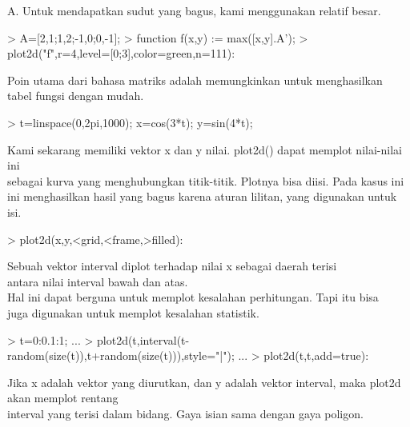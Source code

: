 \documentclass[a4paper,10pt]{article}
\begin{document}
\begin{eulernotebook}
\begin{eulercomment}
\begin{eulercomment}
\begin{eulercomment}
\begin{eulercomment}
\begin{eulercomment}
\begin{eulercomment}
\begin{eulercomment}
A. Untuk mendapatkan sudut yang bagus, kami menggunakan relatif besar.
\end{eulercomment}
\begin{eulerprompt}
> A=[2,1;1,2;-1,0;0,-1];
> function f(x,y) := max([x,y].A');
> plot2d("f",r=4,level=[0;3],color=green,n=111):
\end{eulerprompt}
\begin{eulercomment}
Poin utama dari bahasa matriks adalah memungkinkan untuk menghasilkan
tabel fungsi dengan mudah.
\end{eulercomment}
\begin{eulerprompt}
> t=linspace(0,2pi,1000); x=cos(3*t); y=sin(4*t);
\end{eulerprompt}
\begin{eulercomment}
Kami sekarang memiliki vektor x dan y nilai. plot2d() dapat memplot
nilai-nilai ini\\
sebagai kurva yang menghubungkan titik-titik. Plotnya bisa diisi. Pada
kasus ini\\
ini menghasilkan hasil yang bagus karena aturan lilitan, yang
digunakan untuk\\
isi.
\end{eulercomment}
\begin{eulerprompt}
> plot2d(x,y,<grid,<frame,>filled):
\end{eulerprompt}
\begin{eulercomment}
Sebuah vektor interval diplot terhadap nilai x sebagai daerah terisi\\
antara nilai interval bawah dan atas.\\
Hal ini dapat berguna untuk memplot kesalahan perhitungan. Tapi itu
bisa\\
juga digunakan untuk memplot kesalahan statistik.
\end{eulercomment}
\begin{eulerprompt}
> t=0:0.1:1; ...
> plot2d(t,interval(t-random(size(t)),t+random(size(t))),style="|");  ...
> plot2d(t,t,add=true):
\end{eulerprompt}
\begin{eulercomment}
Jika x adalah vektor yang diurutkan, dan y adalah vektor interval,
maka plot2d akan memplot rentang\\
interval yang terisi dalam bidang. Gaya isian sama dengan gaya
poligon.
\end{eulercomment}

\end{eulercomment}
\end{eulercomment}
\end{eulercomment}
\end{eulercomment}
\end{eulercomment}
\end{eulercomment}
\end{eulernotebook}
\end{document}
